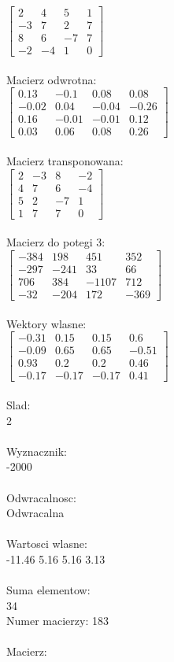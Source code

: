 \documentclass[a4paper,12pt]{article}
\begin{document}
$\begin{bmatrix} 2&4&5&1\\-3&7&2&7\\8&6&-7&7\\-2&-4&1&0 \end{bmatrix}$
\\
\\
Macierz odwrotna:\\

$\begin{bmatrix} 0.13&-0.1&0.08&0.08\\-0.02&0.04&-0.04&-0.26\\0.16&-0.01&-0.01&0.12\\0.03&0.06&0.08&0.26 \end{bmatrix}$
\\
\\
Macierz transponowana:\\

$\begin{bmatrix} 2&-3&8&-2\\4&7&6&-4\\5&2&-7&1\\1&7&7&0 \end{bmatrix}$
\\
\\
Macierz do potegi 3:\\

$\begin{bmatrix} -384&198&451&352\\-297&-241&33&66\\706&384&-1107&712\\-32&-204&172&-369 \end{bmatrix}$
\\
\\
Wektory wlasne:\\

$\begin{bmatrix} -0.31&0.15&0.15&0.6\\-0.09&0.65&0.65&-0.51\\0.93&0.2&0.2&0.46\\-0.17&-0.17&-0.17&0.41 \end{bmatrix}$
\\
\\
Slad:\\
2
\\
\\
Wyznacznik:\\
-2000
\\
\\
Odwracalnosc:\\
Odwracalna
\\
\\
Wartosci wlasne:\\
-11.46 5.16 5.16 3.13
\\
\\
Suma elementow:\\
34
\\
\newpage
Numer macierzy:
183
\\
\\
Macierz:\\
\end{document}
